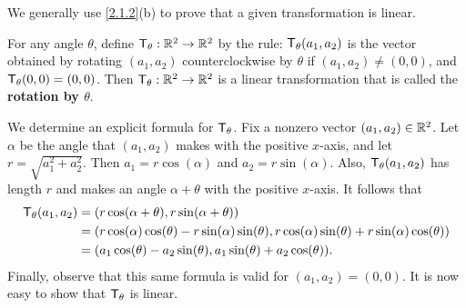 \begin{note}
  We generally use \cref{2.1.2}(b) to prove that a given transformation is linear.
\end{note}

\begin{eg}\label{2.1.3}
  For any angle \(\theta\), define \(\mathsf{T}_{\theta} : \mathbb{R}^2 \to \mathbb{R}^2\) by the rule: \(\mathsf{T}_{\theta}(a_1, a_2)\) is the vector obtained by rotating \((a_1, a_2)\) counterclockwise by \(\theta\) if \((a_1, a_2) \neq (0, 0)\), and \(\mathsf{T}_{\theta}(0, 0) = (0, 0)\).
  Then \(\mathsf{T}_{\theta} : \mathbb{R}^2 \to \mathbb{R}^2\) is a linear transformation that is called the \textbf{rotation by \(\theta\)}.

  We determine an explicit formula for \(\mathsf{T}_{\theta}\).
  Fix a nonzero vector \((a_1, a_2) \in \mathbb{R}^2\).
  Let \(\alpha\) be the angle that \((a_1, a_2)\) makes with the positive \(x\)-axis, and let \(r = \sqrt{a_1^2 +a_2^2}\).
  Then \(a_1 = r \cos(\alpha)\) and \(a_2 = r \sin(\alpha)\).
  Also, \(\mathsf{T}_{\theta}(a_1, a_2)\) has length \(r\) and makes an angle \(\alpha + \theta\) with the positive \(x\)-axis.
  It follows that
  \begin{align*}
    \mathsf{T}_{\theta}(a_1, a_2) & = (r \cos(\alpha + \theta), r \sin(\alpha + \theta))                                                                     \\
                          & = (r \cos(\alpha) \cos(\theta) - r \sin(\alpha) \sin(\theta), r \cos(\alpha) \sin(\theta) + r \sin(\alpha) \cos(\theta)) \\
                          & = (a_1 \cos(\theta) - a_2 \sin(\theta), a_1 \sin(\theta) + a_2 \cos(\theta)).
  \end{align*}
  Finally, observe that this same formula is valid for \((a_1 ,a_2) = (0, 0)\).
  It is now easy to show that \(\mathsf{T}_{\theta}\) is linear.
\end{eg}

